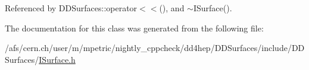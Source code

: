 Referenced by D\+D\+Surfaces\+::operator$<$$<$(), and $\sim$\+I\+Surface().



The documentation for this class was generated from the following file\+:\begin{DoxyCompactItemize}
\item 
/afs/cern.\+ch/user/m/mpetric/nightly\+\_\+cppcheck/dd4hep/\+D\+D\+Surfaces/include/\+D\+D\+Surfaces/\hyperlink{_i_surface_8h}{I\+Surface.\+h}\end{DoxyCompactItemize}
